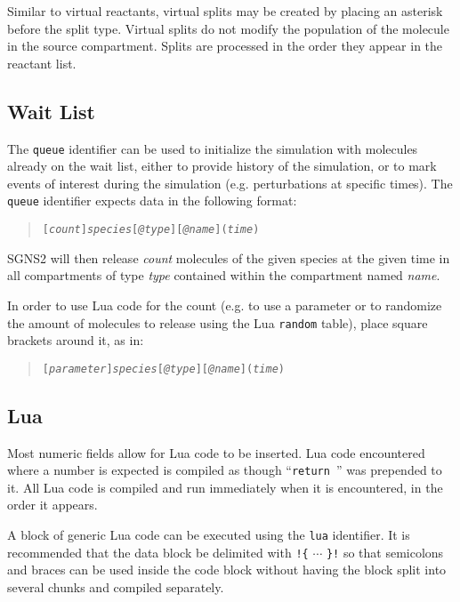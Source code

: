 \documentclass[10pt]{article}
\newcommand{\code}[1]{{\tt {#1}}}
\newcommand{\codeparam}[1]{\textrm{\textit{#1}}}
\newcommand{\optparam}[1]{\textrm{[\textit{#1}]}}
\newcommand{\programname}{SGNS2}
\begin{document}
Similar to virtual reactants, virtual splits may be created by placing an asterisk before the split type. Virtual splits do not modify the population of the molecule in the source compartment. Splits are processed in the order they appear in the reactant list.

\subsection{Wait List}
\label{sec:waitlist}

The \code{queue} identifier can be used to initialize the simulation with molecules already on the wait list, either to provide history of the simulation, or to mark events of interest during the simulation (e.g. perturbations at specific times). The \code{queue} identifier expects data in the following format:

\begin{quote}
\code{\optparam{count}\codeparam{species}\optparam{\code{@}type}\optparam{\code{@}name}(\codeparam{time})}
\end{quote}

{\programname} will then release \codeparam{count} molecules of the given species at the given time in all compartments of type \codeparam{type} contained within the compartment named \codeparam{name}.

In order to use Lua code for the count (e.g. to use a parameter or to randomize the amount of molecules to release using the Lua \code{random} table), place square brackets around it, as in:

\begin{quote}
\code{[\codeparam{parameter}]\codeparam{species}\optparam{\code{@}type}\optparam{\code{@}name}(\codeparam{time})}
\end{quote}

\subsection{Lua}
\label{sec:lua}

Most numeric fields allow for Lua code to be inserted. Lua code encountered where a number is expected is compiled as though ``\code{return }'' was prepended to it. All Lua code is compiled and run immediately when it is encountered, in the order it appears.

A block of generic Lua code can be executed using the \code{lua} identifier. It is recommended that the data block be delimited with \code{!\{} $\cdots$ \code{\}!} so that semicolons and braces can be used inside the code block without having the block split into several chunks and compiled separately.
\end{document}
